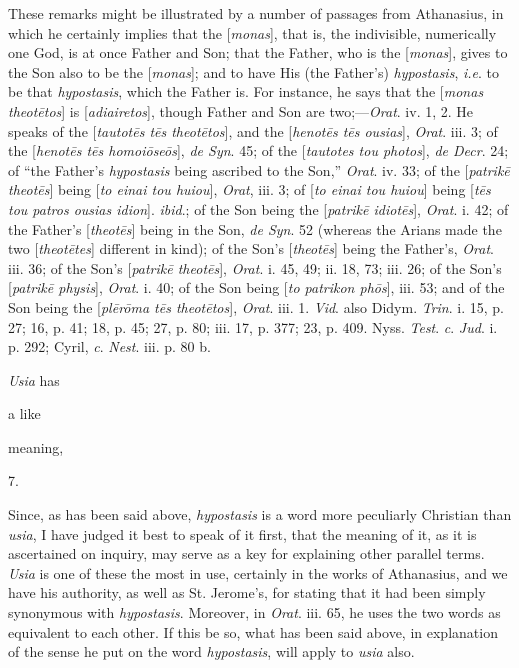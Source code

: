 These remarks might be illustrated by a
number of passages from Athanasius, in which he certainly
implies that the [\emph{monas}], that is, the
indivisible, numerically one God, is at once Father and Son;
that the Father, who is the [\emph{monas}], gives to the Son
also to be the [\emph{monas}]; and to have His (the Father's) \emph{hypostasis},
\emph{i.e}. to be that \emph{hypostasis}, which the Father is.
For instance, he says that the [\emph{monas theot\={e}tos}]
is [\emph{adiairetos}], though Father and Son are two;—\emph{Orat}.
iv. 1, 2. He speaks of the [\emph{tautot\={e}s t\={e}s
theot\={e}tos}], and the [\emph{henot\={e}s t\={e}s
ousias}], \emph{Orat}. iii. 3; of the [\emph{henot\={e}s t\={e}s
homoi\={o}se\={o}s}], \emph{de Syn}. 45; of the [\emph{tautotes
tou photos}], \emph{de Decr}. 24; of ``the Father's \emph{hypostasis}
being ascribed to the Son,'' \emph{Orat}. iv. 33; of the [\emph{patrik\={e}
theot\={e}s}] being [\emph{to einai tou huiou}], \emph{Orat},
iii. 3; of [\emph{to einai tou huiou}] being [\emph{t\={e}s
tou patros ousias idion}]. \emph{ibid}.; of the Son being
the [\emph{patrik\={e} idiot\={e}s}], \emph{Orat}. i.
42; of the Father's [\emph{theot\={e}s}] being in the Son, \emph{de
Syn}. 52 (whereas the Arians made the two [\emph{theot\={e}tes}]
different in kind); of the Son's [\emph{theot\={e}s}] being
the Father's, \emph{Orat}. iii. 36; of the Son's [\emph{patrik\={e}
theot\={e}s}], \emph{Orat}. i. 45, 49; ii. 18, 73; iii.
26; of the Son's [\emph{patrik\={e} physis}], \emph{Orat}.
i. 40; of the Son being [\emph{to patrikon ph\={o}s}], iii.
53; and of the Son being the [\emph{pl\={e}r\={o}ma t\={e}s
theot\={e}tos}], \emph{Orat}. iii. 1. \emph{Vid}. also
Didym. \emph{Trin}. i. 15, p. 27; 16, p. 41; 18, p. 45; 27, p.
80; iii. 17, p. 377; 23, p. 409. Nyss. \emph{Test}. \emph{c}. \emph{Jud}.
i. p. 292; Cyril, \emph{c}. \emph{Nest}. iii. p. 80 b.

\emph{Usia} has

a like

meaning,

7.

Since, as has been said above, \emph{hypostasis}
is a word more peculiarly Christian than \emph{usia}, I have
judged it best to speak of it first, that the meaning of it,
as it is ascertained on inquiry, may serve as a key for
explaining other parallel terms. \emph{Usia} is one of these
the most in use, certainly in the works of Athanasius, and we
have his authority, as well as St. Jerome's, for stating that it
had been simply synonymous with \emph{hypostasis}. Moreover,
in \emph{Orat}. iii. 65, he uses the two words as equivalent
to each other. If this be so, what has been said above, in
explanation of the sense he put on the word \emph{hypostasis},
will apply to \emph{usia} also.

